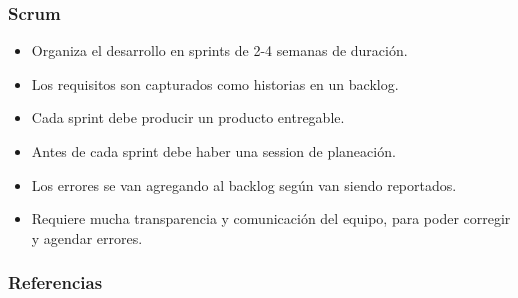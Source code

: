 \documentclass{beamer}
\begin{document}
\begin{frame}
    \frametitle{Scrum}
    \begin{itemize}
        \item{Organiza el desarrollo en sprints de 2-4 semanas de duraci\'on.}
        \item{Los requisitos son capturados como historias en un backlog.}
        \item{Cada sprint debe producir un producto entregable.}
        \item{Antes de cada sprint debe haber una session de planeaci\'on.}
        \item{Los errores se van agregando al backlog seg\'un van siendo reportados.}
        \item{Requiere mucha transparencia y comunicaci\'on del equipo,
        para poder corregir y agendar errores.}
    \end{itemize}
\end{frame}

\begin{frame}
\frametitle{Referencias}


\end{frame}
\end{document}
